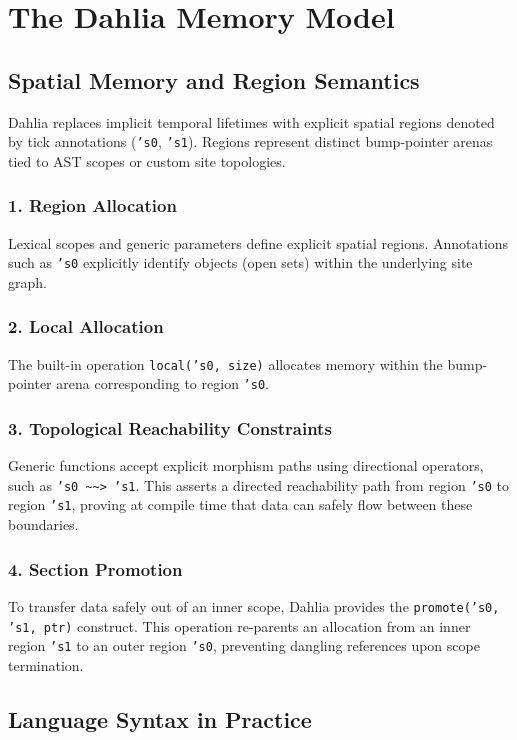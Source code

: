 \documentclass[11pt]{article}
\begin{document}
\pagebreak
\section{The Dahlia Memory Model}

\subsection{Spatial Memory and Region Semantics}
Dahlia replaces implicit temporal lifetimes with explicit spatial regions denoted by tick annotations (\texttt{'s0}, \texttt{'s1}). Regions represent distinct bump-pointer arenas tied to AST scopes or custom site topologies.

\subsubsection{1. Region Allocation}
Lexical scopes and generic parameters define explicit spatial regions. Annotations such as \texttt{'s0} explicitly identify objects (open sets) within the underlying site graph.

\subsubsection{2. Local Allocation}
The built-in operation \texttt{local('s0, size)} allocates memory within the bump-pointer arena corresponding to region \texttt{'s0}.

\subsubsection{3. Topological Reachability Constraints}
Generic functions accept explicit morphism paths using directional operators, such as \texttt{'s0 \textasciitilde\textasciitilde> 's1}. This asserts a directed reachability path from region \texttt{'s0} to region \texttt{'s1}, proving at compile time that data can safely flow between these boundaries.

\subsubsection{4. Section Promotion}
To transfer data safely out of an inner scope, Dahlia provides the \texttt{promote('s0, 's1, ptr)} construct. This operation re-parents an allocation from an inner region \texttt{'s1} to an outer region \texttt{'s0}, preventing dangling references upon scope termination.

\subsection{Language Syntax in Practice}
\end{document}
